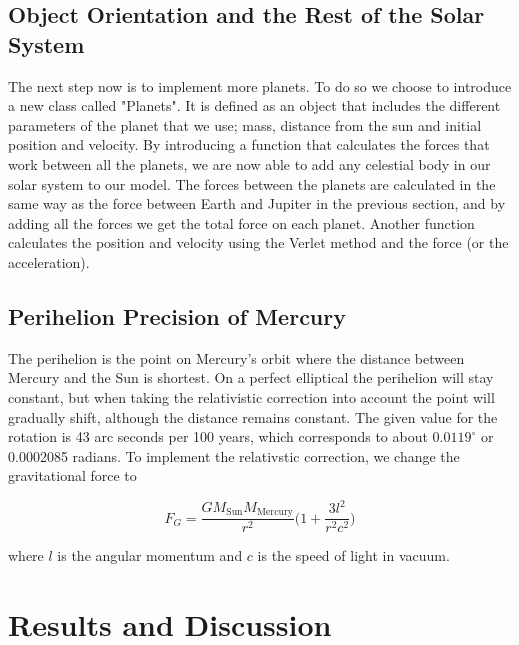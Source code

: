 \documentclass{article}
\begin{document}
\subsection{Object Orientation and the Rest of the Solar System}
The next step now is to implement more planets. To do so we choose to introduce a new class called "Planets". It is defined as an object that includes the different parameters of the planet that we use; mass, distance from the sun and initial position and velocity. By introducing a function that calculates the forces that work between all the planets, we are now able to add any celestial body in our solar system to our model. The forces between the planets are calculated in the same way as the force between Earth and Jupiter in the previous section, and by adding all the forces we get the total force on each planet. Another function calculates the position and velocity using the Verlet method and the force (or the acceleration).

\subsection{Perihelion Precision of Mercury}
The perihelion is the point on Mercury's orbit where the distance between Mercury and the Sun is shortest. On a perfect elliptical the perihelion will stay constant, but when taking the relativistic correction into account the point will gradually shift, although the distance remains constant. The given value for the rotation is 43 arc seconds per 100 years, which corresponds to about $0.0119^{\circ}$ or 0.0002085 radians. To implement the relativstic correction, we change the gravitational force to

$$F_G=\frac{GM_{\mathrm{Sun}}M_{\mathrm{Mercury}}}{r^2}\bigg( 1+\frac{3l^2}{r^2c^2}\bigg)$$

where $l$ is the angular momentum and $c$ is the speed of light in vacuum.


\section{Results and Discussion}
\end{document}
